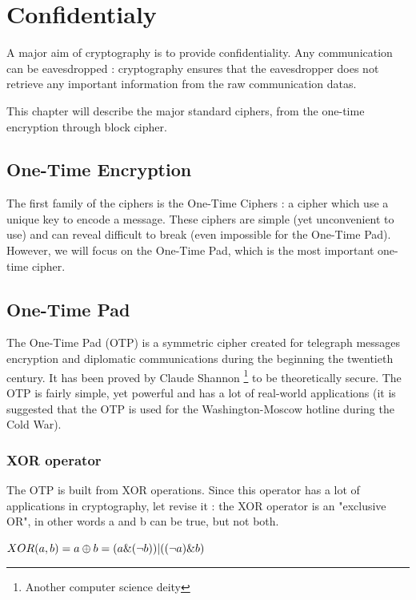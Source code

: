 \chapter{Confidentialy}

A major aim of cryptography is to provide confidentiality. Any communication can be eavesdropped : cryptography ensures that the eavesdropper does not retrieve any important information from the raw communication datas.

This chapter will describe the major standard ciphers, from the one-time encryption through block cipher.

\section{One-Time Encryption}

The first family of the ciphers is the One-Time Ciphers : a cipher which use a unique key to encode a message. These ciphers are simple (yet unconvenient to use) and can reveal difficult to break (even impossible for the One-Time Pad). However, we will focus on the One-Time Pad, which is the most important one-time cipher. 

\section{One-Time Pad}

The One-Time Pad (OTP) is a symmetric cipher created for telegraph messages encryption and diplomatic communications during the beginning the twentieth century. It has been proved by Claude Shannon \footnote{Another computer science deity} to be theoretically secure. The OTP is fairly simple, yet powerful and has a lot of real-world applications (it is suggested that the OTP is used for the Washington-Moscow hotline during the Cold War).

\subsection{XOR operator}

The OTP is built from XOR operations. Since this operator has a lot of applications in cryptography, let revise it : the XOR operator is an "exclusive OR", in other words a and b can be true, but not both.


\begin{mydef}
\begin{minipage}[t]{0.8\textwidth}
\centering
    $XOR(a,b) = a \oplus b = (a\&(\lnot b)) | ((\lnot a)\&b)$
\end{minipage}
\end{mydef}

